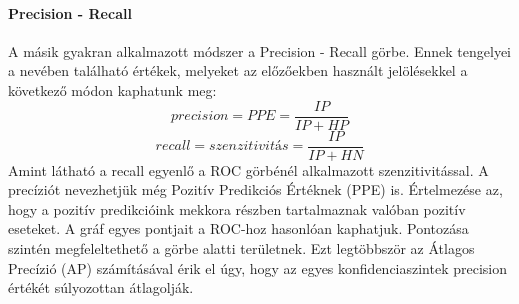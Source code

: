 \paragraph{Precision - Recall}\hfill
A másik gyakran alkalmazott módszer a Precision - Recall görbe. Ennek tengelyei a nevében található értékek, melyeket az előzőekben használt jelölésekkel a következő módon kaphatunk meg:
\begin{equation}
    precision = PPE = \frac{IP}{IP + HP}
\end{equation}
\begin{equation}
    recall = szenzitivitás =  \frac{IP}{IP + HN}
\end{equation}
Amint látható a recall egyenlő a ROC görbénél alkalmazott szenzitivitással. A precíziót nevezhetjük még Pozitív Predikciós Értéknek (PPE) is. Értelmezése az, hogy a pozitív predikcióink mekkora részben tartalmaznak valóban pozitív eseteket. A gráf egyes pontjait a ROC-hoz hasonlóan kaphatjuk. Pontozása szintén megfeleltethető a görbe alatti területnek. Ezt legtöbbször az Átlagos Precízió (AP) számításával érik el úgy, hogy az egyes konfidenciaszintek precision értékét súlyozottan átlagolják.

